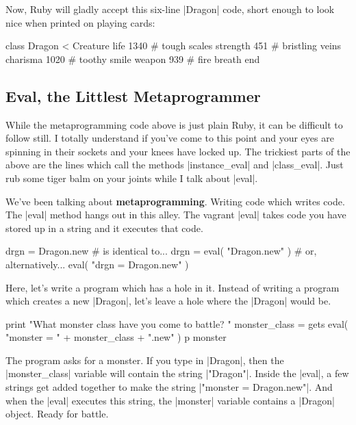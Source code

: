 \documentclass[12pt,twoside]{report}
\begin{document}
Now, Ruby will gladly accept this six-line
\rubyinline|Dragon| code, short enough to look nice
when printed on playing cards:


\begin{rubycode}

 class Dragon < Creature
   life 1340     # tough scales
   strength 451  # bristling veins
   charisma 1020 # toothy smile
   weapon 939    # fire breath
 end

\end{rubycode}




\subsection{Eval, the Littlest Metaprogrammer}



While the metaprogramming code above is just plain Ruby, it can be
difficult to follow still. I totally understand if you've come to this
point and your eyes are spinning in their sockets and your knees have
locked up.  The trickiest parts of the above are the lines which call
the methods \rubyinline|instance_eval| and
\rubyinline|class_eval|.  Just rub some tiger balm on
your joints while I talk about \rubyinline|eval|.

We've been talking about {\bf metaprogramming}.  Writing code which
writes code.  The \rubyinline|eval| method hangs out
in this alley. The vagrant \rubyinline|eval| takes
code you have stored up in a string and it executes that code.


\begin{rubycode}

 drgn = Dragon.new
 # is identical to...
 drgn = eval( "Dragon.new" )
 # or, alternatively...
 eval( "drgn = Dragon.new" )

\end{rubycode}


Here, let's write a program which has a hole in it.  Instead of
writing a program which creates a new
\rubyinline|Dragon|, let's leave a hole where the
\rubyinline|Dragon| would be.


\begin{rubycode}

 print "What monster class have you come to battle? "
 monster_class = gets
 eval( "monster = " + monster_class + ".new" )
 p monster

\end{rubycode}


The program asks for a monster.  If you type in
\rubyinline|Dragon|, then the
\rubyinline|monster_class| variable will contain the
string \rubyinline|"Dragon"|.  Inside the
\rubyinline|eval|, a few strings get added together to
make the string \rubyinline|"monster = Dragon.new"|.
And when the \rubyinline|eval| executes this string,
the \rubyinline|monster| variable contains a
\rubyinline|Dragon| object.  Ready for battle.
\end{document}
